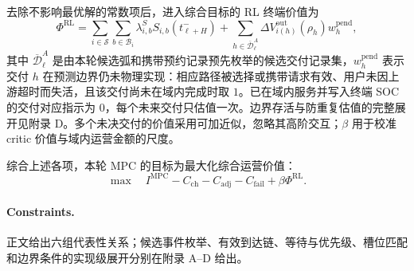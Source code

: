 \documentclass[12pt,a4paper,UTF8]{ctexart}
\begin{document}
去除不影响最优解的常数项后，进入综合目标的 RL 终端价值为
\begin{equation}
\Phi^{\mathrm{RL}}
=
\sum_{i\in\mathcal S}\sum_{b\in\mathcal B_i}
\lambda^S_{i,b}S_{i,b}(t_{\ell+H}^{-})
+\sum_{h\in\overline{\mathcal D}_{\ell}^{A}}
\Delta V_{i(h)}^{\mathrm{out}}(\rho_h)
w_h^{\mathrm{pend}},
\label{eq:rl_terminal_value}
\end{equation}
其中 $\overline{\mathcal D}_{\ell}^{A}$ 是由本轮候选弧和携带预约记录预先枚举的候选交付记录集，$w_h^{\mathrm{pend}}$ 表示交付 $h$ 在预测边界仍未物理实现：相应路径被选择或携带请求有效、用户未因上游超时而失活，且该交付尚未在域内完成时取 $1$。已在域内服务并写入终端 SOC 的交付对应指示为 $0$，每个未来交付只估值一次。边界存活与防重复估值的完整展开见附录 D。多个未决交付的价值采用可加近似，忽略其高阶交互；$\beta$ 用于校准 critic 价值与域内运营金额的尺度。

综合上述各项，本轮 MPC 的目标为最大化综合运营价值：
\begin{equation}
\max\quad
I^{\mathrm{MPC}}-C_{\mathrm{ch}}-C_{\mathrm{adj}}-C_{\mathrm{fail}}
+\beta\Phi^{\mathrm{RL}}.
\label{eq:objective}
\end{equation}

\paragraph{Constraints.}
正文给出六组代表性关系；候选事件枚举、有效到达链、等待与优先级、槽位匹配和边界条件的实现级展开分别在附录 A--D 给出。
\end{document}
